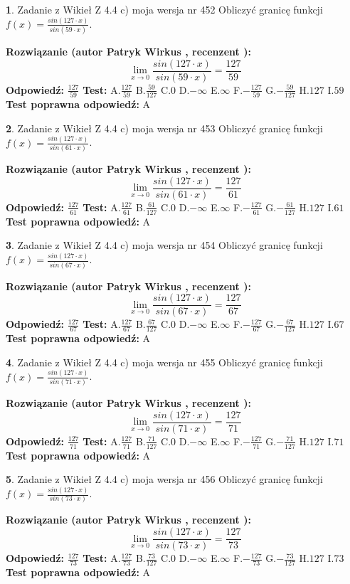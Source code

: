 \documentclass[12pt, a4paper]{article}
\theoremstyle{definition} %
\newtheorem{zad}{}
\newcommand{\zadStart}[1]{\begin{zad}#1\newline}
\newcommand{\zadStop}{\end{zad}}
\newcommand{\rozwStart}[2]{\noindent \textbf{Rozwiązanie (autor #1 , recenzent #2): }\newline}
\newcommand{\rozwStop}{\newline}
\newcommand{\odpStart}{\noindent \textbf{Odpowiedź:}\newline}
\newcommand{\odpStop}{\newline}
\newcommand{\testStart}{\noindent \textbf{Test:}\newline}
\newcommand{\testStop}{\newline}
\newcommand{\kluczStart}{\noindent \textbf{Test poprawna odpowiedź:}\newline}
\newcommand{\kluczStop}{\newline}
\begin{document}
\zadStart{Zadanie z Wikieł Z 4.4 c) moja wersja nr 452}
Obliczyć granicę funkcji $f(x)=\frac{sin(127\cdot x)}{sin(59\cdot x)}$.
\zadStop
\rozwStart{Patryk Wirkus}{}
$$\lim\limits_{x\to 0}\frac{sin(127\cdot x)}{sin(59\cdot x)}=
\frac{127}{59}$$
\rozwStop
\odpStart
$\frac{127}{59}$
\odpStop
\testStart
A.$\frac{127}{59}$
B.$\frac{59}{127}$
C.$0$
D.$-\infty$
E.$\infty$
F.$-\frac{127}{59}$
G.$-\frac{59}{127}$
H.$127$
I.$59$
\testStop
\kluczStart
A
\kluczStop



\zadStart{Zadanie z Wikieł Z 4.4 c) moja wersja nr 453}
Obliczyć granicę funkcji $f(x)=\frac{sin(127\cdot x)}{sin(61\cdot x)}$.
\zadStop
\rozwStart{Patryk Wirkus}{}
$$\lim\limits_{x\to 0}\frac{sin(127\cdot x)}{sin(61\cdot x)}=
\frac{127}{61}$$
\rozwStop
\odpStart
$\frac{127}{61}$
\odpStop
\testStart
A.$\frac{127}{61}$
B.$\frac{61}{127}$
C.$0$
D.$-\infty$
E.$\infty$
F.$-\frac{127}{61}$
G.$-\frac{61}{127}$
H.$127$
I.$61$
\testStop
\kluczStart
A
\kluczStop



\zadStart{Zadanie z Wikieł Z 4.4 c) moja wersja nr 454}
Obliczyć granicę funkcji $f(x)=\frac{sin(127\cdot x)}{sin(67\cdot x)}$.
\zadStop
\rozwStart{Patryk Wirkus}{}
$$\lim\limits_{x\to 0}\frac{sin(127\cdot x)}{sin(67\cdot x)}=
\frac{127}{67}$$
\rozwStop
\odpStart
$\frac{127}{67}$
\odpStop
\testStart
A.$\frac{127}{67}$
B.$\frac{67}{127}$
C.$0$
D.$-\infty$
E.$\infty$
F.$-\frac{127}{67}$
G.$-\frac{67}{127}$
H.$127$
I.$67$
\testStop
\kluczStart
A
\kluczStop



\zadStart{Zadanie z Wikieł Z 4.4 c) moja wersja nr 455}
Obliczyć granicę funkcji $f(x)=\frac{sin(127\cdot x)}{sin(71\cdot x)}$.
\zadStop
\rozwStart{Patryk Wirkus}{}
$$\lim\limits_{x\to 0}\frac{sin(127\cdot x)}{sin(71\cdot x)}=
\frac{127}{71}$$
\rozwStop
\odpStart
$\frac{127}{71}$
\odpStop
\testStart
A.$\frac{127}{71}$
B.$\frac{71}{127}$
C.$0$
D.$-\infty$
E.$\infty$
F.$-\frac{127}{71}$
G.$-\frac{71}{127}$
H.$127$
I.$71$
\testStop
\kluczStart
A
\kluczStop



\zadStart{Zadanie z Wikieł Z 4.4 c) moja wersja nr 456}
Obliczyć granicę funkcji $f(x)=\frac{sin(127\cdot x)}{sin(73\cdot x)}$.
\zadStop
\rozwStart{Patryk Wirkus}{}
$$\lim\limits_{x\to 0}\frac{sin(127\cdot x)}{sin(73\cdot x)}=
\frac{127}{73}$$
\rozwStop
\odpStart
$\frac{127}{73}$
\odpStop
\testStart
A.$\frac{127}{73}$
B.$\frac{73}{127}$
C.$0$
D.$-\infty$
E.$\infty$
F.$-\frac{127}{73}$
G.$-\frac{73}{127}$
H.$127$
I.$73$
\testStop
\kluczStart
A
\kluczStop
\end{document}
